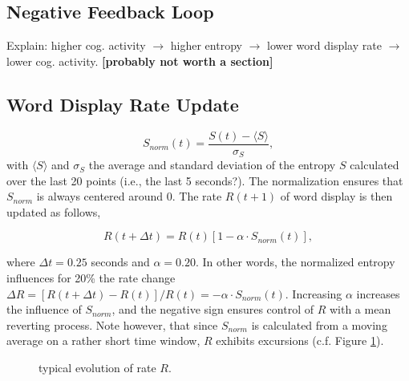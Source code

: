 \subsection{Negative Feedback Loop}

Explain: higher cog. activity  $\rightarrow$  higher entropy $\rightarrow$  lower word display rate $\rightarrow$ lower cog. activity. {\bf [probably not worth a section]}


\subsection{Word Display Rate Update}

\begin{equation}
\label{eq:Snormalized}
S_{norm}(t) = \frac{S(t) - \langle S \rangle}{\sigma_{S}}, 
\end{equation}
with $\langle S \rangle$ and $\sigma_{S}$ the average and standard deviation of the entropy $S$ calculated over the last 20 points (i.e., the last 5 seconds?). The normalization ensures that $S_{norm}$ is always centered around $0$. The rate $R(t+1)$ of word display is then updated as follows,

\begin{equation}
R(t+\Delta t) = R(t) \left[1 - \alpha \cdot S_{norm}(t)\right],
\label{eq:RateChange}
\end{equation}

where $\Delta t = 0.25$ seconds and $\alpha = 0.20$. In other words, the normalized entropy influences for 20\% the rate change $\Delta R =  \left[ R(t+\Delta t) - R(t) \right] / R(t) = - \alpha \cdot S_{norm}(t)$. Increasing $\alpha$ increases the influence of $S_{norm}$, and the negative sign ensures control of $R$ with a mean reverting process. Note however, that since $S_{norm}$ is calculated from a moving average on a rather short time window, $R$ exhibits excursions (c.f. Figure \ref{fig:trajectory}).

\begin{figure}[!t]
\centering
\caption{typical evolution of rate $R$.}
\label{fig:trajectory}
\end{figure}
